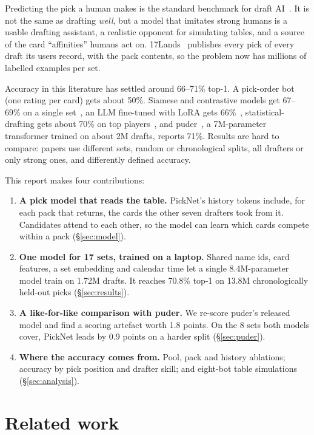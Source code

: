 \documentclass[10pt,letterpaper]{article}
\newcommand{\pct}[1]{#1\%}
\begin{document}
Predicting the pick a human makes is the standard benchmark for draft AI~\cite{ward2021,bertram2021,draftfm}.
It is not the same as drafting \emph{well}, but a model that imitates strong humans is a usable drafting
assistant, a realistic opponent for simulating tables, and a source of the card ``affinities'' humans act on.
17Lands~\cite{17lands} publishes every pick of every draft its users record, with the pack contents, so the
problem now has millions of labelled examples per set.

Accuracy in this literature has settled around 66--71\% top-1. A pick-order bot (one rating per card) gets
about 50\%. Siamese and contrastive models get 67--69\% on a single set~\cite{bertram2024infonce},
an LLM fine-tuned with LoRA gets 66\%~\cite{urzagpt}, statistical-drafting gets about 70\% on top
players~\cite{statdraft}, and puder~\cite{puder}, a 7M-parameter transformer trained on about 2M drafts, reports 71\%.
Results are hard to compare: papers use different sets, random or chronological splits, all drafters or only
strong ones, and differently defined accuracy.

This report makes four contributions:
\begin{enumerate}
\item \textbf{A pick model that reads the table.} PickNet's history tokens include, for each pack that
returns, the cards the other seven drafters took from it. Candidates attend to each other, so the model can
learn which cards compete within a pack (\S\ref{sec:model}).
\item \textbf{One model for 17 sets, trained on a laptop.} Shared name ids, card features, a set embedding and
calendar time let a single 8.4M-parameter model train on 1.72M drafts. It reaches \pct{70.8} top-1
on 13.8M chronologically held-out picks (\S\ref{sec:results}).
\item \textbf{A like-for-like comparison with puder.} We re-score puder's released model and find
a scoring artefact worth 1.8 points. On the 8 sets both models cover, PickNet leads by 0.9 points on a
harder split (\S\ref{sec:puder}).
\item \textbf{Where the accuracy comes from.} Pool, pack and history ablations; accuracy by pick position and
drafter skill; and eight-bot table simulations (\S\ref{sec:analysis}).
\end{enumerate}

\section{Related work}
\end{document}

